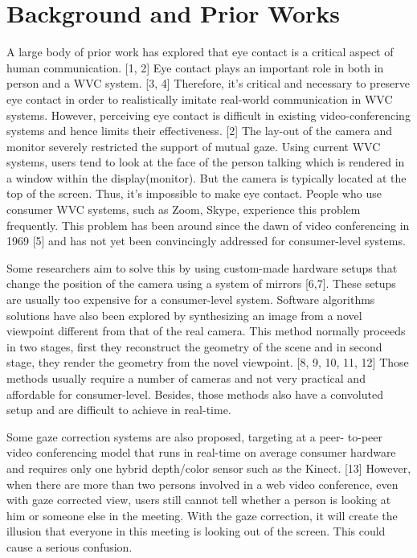 \section{Background and Prior Works}

A large body of prior work has explored that eye contact is a critical aspect of human communication. [1, 2] Eye contact plays an important role in both in person and a WVC system. [3, 4] Therefore, it’s critical and necessary to preserve eye contact in order to realistically imitate real-world communication in WVC systems. However, perceiving eye contact is difficult in existing video-conferencing systems and hence limits their effectiveness. [2] The lay-out of the camera and monitor severely restricted the support of mutual gaze. Using current WVC systems, users tend to look at the face of the person talking which is rendered in a window within the display(monitor). But the camera is typically located at the top of the screen. Thus, it’s impossible to make eye contact. People who use consumer WVC systems, such as Zoom, Skype, experience this problem frequently. This problem has been around since the dawn of video conferencing in 1969 [5] and has not yet been convincingly addressed for consumer-level systems.

Some researchers aim to solve this by using custom-made hardware setups that change the position of the camera using a system of mirrors [6,7]. These setups are usually too expensive for a consumer-level system. Software algorithms solutions have also been explored by synthesizing an image from a novel viewpoint different from that of the real camera. This method normally proceeds in two stages, first they reconstruct the geometry of the scene and in second stage, they render the geometry from the novel viewpoint. [8, 9, 10, 11, 12] Those methods usually require a number of cameras and not very practical and affordable for consumer-level. Besides, those methods also have a convoluted setup and are difficult to achieve in real-time.

Some gaze correction systems are also proposed, targeting at a peer- to-peer video conferencing model that runs in real-time on average consumer hardware and requires only one hybrid depth/color sensor such as the Kinect. [13] However, when there are more than two persons involved in a web video conference, even with gaze corrected view, users still cannot tell whether a person is looking at him or someone else in the meeting. With the gaze correction, it will create the illusion that everyone in this meeting is looking out of the screen. This could cause a serious confusion.


